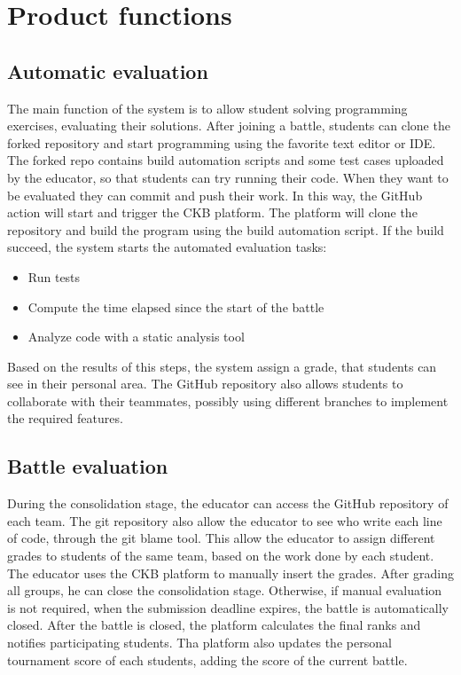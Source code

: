 \section{Product functions}
\subsection{Automatic evaluation}
The main function of the system is to allow student solving programming exercises, evaluating their solutions.
After joining a battle, students can clone the forked repository and start programming using the favorite text editor or IDE.
The forked repo contains build automation scripts and some test cases  uploaded by the educator, so that students can try running their code.
When they want to be evaluated they can commit and push their work. In this way, the GitHub action will start and trigger the CKB platform.
The platform will clone the repository and build the program using the build automation script.
If the build succeed, the system starts the automated evaluation tasks:
\begin{itemize}
	\item Run tests
	\item Compute the time elapsed since the start of the battle
	\item Analyze code with a static analysis tool
\end{itemize} 
Based on the results of this steps, the system assign a grade, that students can see in their personal area.
The GitHub repository also allows students to collaborate with their teammates, possibly using different branches to implement the required features.
\begin{adjustbox}{
	max size={\textwidth}{},
	caption={Automatic evaluation activity diagram},
	label={fig:Automatic evaluation activity diagram},
	figure=H}
\centering
{}
\end{adjustbox}

\subsection{Battle evaluation}
During the consolidation stage, the educator can access the GitHub repository of each team.
The git repository also allow the educator to see who write each line of code, through the git blame tool.
This allow the educator to assign different grades to students of the same team, based on the work done by each student.
The educator uses the CKB platform to manually insert the grades.
After grading all groups, he can close the consolidation stage.
Otherwise, if manual evaluation is not required, when the submission deadline expires,
the battle is automatically closed.
After the battle is closed, the platform calculates the final ranks and notifies participating students.
Tha platform also updates the personal tournament score of each students, adding the score of the current battle.
\begin{adjustbox}{
	max size={\textwidth}{},
	caption={ Battle evaluation activity diagram},
	label={fig:Battle evaluation activity diagram},
	figure=H}
\centering
{}
\end{adjustbox}


